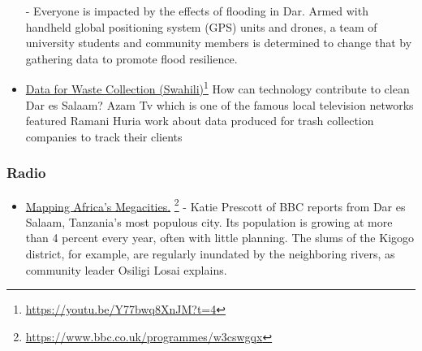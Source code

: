 \documentclass[a4paper,12pt,twoside]{article}
\begin{document}
\begin{mdframed}[hidealllines=true,backgroundcolor=RHgreen!10,innerleftmargin=6pt,innerrightmargin=6pt,leftmargin=-3pt,rightmargin=-3pt]
\begin{itemize}
- Everyone is impacted by the effects of flooding in Dar. Armed with handheld global positioning system (GPS) units and drones, a team of university students and community members is determined to change that by gathering data to promote flood resilience.
    \item \href{https://youtu.be/Y77bwq8XnJM?t=4}{ Data for Waste Collection (Swahili)}\footnote{\url{https://youtu.be/Y77bwq8XnJM?t=4}}
How can technology contribute to clean Dar es Salaam? Azam Tv which is one of the famous local television networks featured Ramani Huria work about data produced for trash collection companies to track their clients
\end{itemize}
\end{mdframed}
\subsubsection{Radio}
\bigskip
\begin{mdframed}[hidealllines=true,backgroundcolor=RHgreen!10,innerleftmargin=6pt,innerrightmargin=6pt,leftmargin=-3pt,rightmargin=-3pt]
\begin{itemize}
    \item \href{https://www.bbc.co.uk/programmes/w3cswgqx}{Mapping Africa's Megacities.} \footnote{\url{https://www.bbc.co.uk/programmes/w3cswgqx}}
- Katie Prescott of BBC reports from Dar es Salaam, Tanzania's most populous city. Its population is growing at more than 4 percent every year, often with little planning. The slums of the  Kigogo district, for example, are regularly inundated by the neighboring rivers, as community leader Osiligi Losai explains.
\end{itemize}
\end{mdframed}
\end{document}
